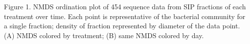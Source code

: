 Figure 1. NMDS ordination plot of 454 sequence data from SIP fractions of each treatment over time. Each point is representative of the bacterial community for a single fraction; density of fraction represented by diameter of the data point. (A) NMDS colored by treatment; (B) same NMDS colored by day.